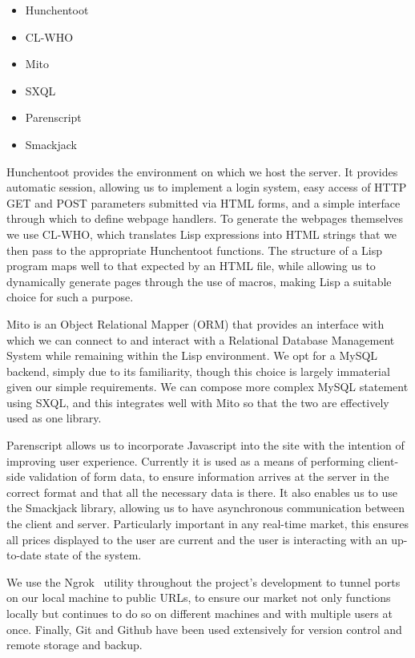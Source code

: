 \begin{itemize}
	\item Hunchentoot \cite{Hunchentoot}
	\item CL-WHO \cite{CL-WHO}
	\item Mito \cite{Mito}
	\item SXQL \cite{SXQL}
	\item Parenscript \cite{Parenscript}
	\item Smackjack \cite{Smackjack}
\end{itemize}

Hunchentoot provides the environment on which we host the server. It provides
automatic session, allowing us to implement a login system, easy access of HTTP
GET and POST parameters submitted via HTML forms, and a simple interface
through which to define webpage handlers. To generate the webpages themselves
we use CL-WHO, which translates Lisp expressions into HTML strings that we then
pass to the appropriate Hunchentoot functions. The structure of a Lisp program
maps well to that expected by an HTML file, while allowing us to dynamically
generate pages through the use of macros, making Lisp a suitable choice for
such a purpose.

Mito is an Object Relational Mapper (ORM) that provides an interface with which
we can connect to and interact with a Relational Database Management System
while remaining within the Lisp environment. We opt for a MySQL backend, simply
due to its familiarity, though this choice is largely immaterial given our
simple requirements. We can compose more complex MySQL statement using SXQL,
and this integrates well with Mito so that the two are effectively used as one
library.

Parenscript allows us to incorporate Javascript into the site with the
intention of improving user experience. Currently it is used as a means of
performing client-side validation of form data, to ensure information arrives
at the server in the correct format and that all the necessary data is there.
It also enables us to use the Smackjack library, allowing us to have
asynchronous communication between the client and server. Particularly
important in any real-time market, this ensures all prices displayed to the
user are current and the user is interacting with an up-to-date state of the
system.

We use the Ngrok~\cite{ngrok} utility throughout the project's development to
tunnel ports on our local machine to public URLs, to ensure our market not only
functions locally but continues to do so on different machines and with
multiple users at once. Finally, Git and Github have been used extensively for
version control and remote storage and backup.
